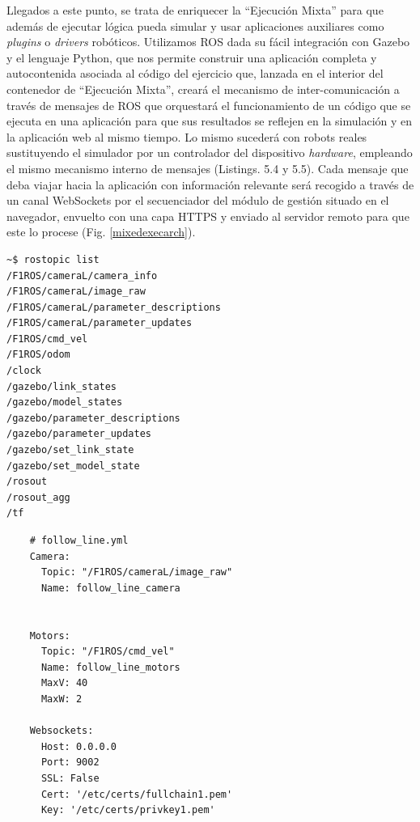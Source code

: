 Llegados a este punto, se trata de enriquecer la ``Ejecución Mixta'' para que además de ejecutar lógica pueda simular y usar aplicaciones auxiliares como \textit{plugins} o \textit{drivers} robóticos. Utilizamos ROS dada su fácil integración con Gazebo y el lenguaje Python, que nos permite construir una aplicación completa y autocontenida asociada al código del ejercicio que, lanzada en el interior del contenedor de ``Ejecución Mixta'', creará el mecanismo de inter-comunicación a través de mensajes de ROS que orquestará el funcionamiento de un código que se ejecuta en una aplicación para que sus resultados se reflejen en la simulación y en la aplicación web al mismo tiempo. Lo mismo sucederá con robots reales sustituyendo el simulador por un controlador del dispositivo \textit{hardware}, empleando el mismo mecanismo interno de mensajes (Listings. 5.4 y 5.5). Cada mensaje que deba viajar hacia la aplicación con información relevante será recogido a través de un canal WebSockets por el secuenciador del módulo de gestión situado en el navegador, envuelto con una capa HTTPS y enviado al servidor remoto para que este lo procese (Fig. \ref{mixedexecarch}).

\begin{lstlisting}[language=bash, caption=Topics de ROS asociados a los Canales de Comunicación Internos]
~$ rostopic list
/F1ROS/cameraL/camera_info
/F1ROS/cameraL/image_raw
/F1ROS/cameraL/parameter_descriptions
/F1ROS/cameraL/parameter_updates
/F1ROS/cmd_vel
/F1ROS/odom
/clock
/gazebo/link_states
/gazebo/model_states
/gazebo/parameter_descriptions
/gazebo/parameter_updates
/gazebo/set_link_state
/gazebo/set_model_state
/rosout
/rosout_agg
/tf
\end{lstlisting}

\begin{verbatim}
    # follow_line.yml
    Camera:
      Topic: "/F1ROS/cameraL/image_raw" 
      Name: follow_line_camera
    
    
    Motors:
      Topic: "/F1ROS/cmd_vel"
      Name: follow_line_motors
      MaxV: 40
      MaxW: 2
    
    Websockets:
      Host: 0.0.0.0 
      Port: 9002
      SSL: False
      Cert: '/etc/certs/fullchain1.pem' 
      Key: '/etc/certs/privkey1.pem'
\end{verbatim}
\begin{lstlisting}[caption=Configuración de Canales del Secuenciador en formato YAML]
\end{lstlisting}

